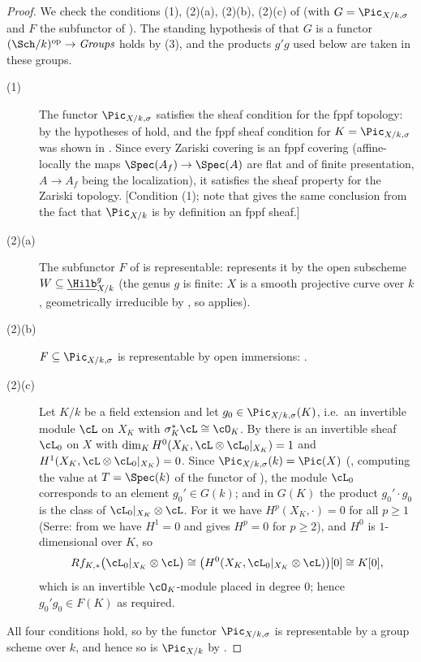 \begin{proof}
We check the conditions (1), (2)(a), (2)(b), (2)(c) of
 (with $G=\Pic_{X/k,\sigma}$ and $F$ the
subfunctor of ).  The standing hypothesis
of  that $G$ is a functor
$(\Sch/k)^{\mathrm{op}}\to\textit{Groups}$ holds by
(3), and the products $g'g$ used below are
taken in these groups.
\begin{description}
\item[(1)] The functor $\Pic_{X/k,\sigma}$ satisfies the sheaf condition
for the fppf topology: by  the hypotheses of
 hold, and the fppf sheaf condition for
$K=\Pic_{X/k,\sigma}$ was shown in
.  Since every Zariski covering is an fppf covering
(affine-locally the maps $\Spec(A_f)\to\Spec(A)$ are flat and of finite
presentation, $A\to A_f$ being the localization), it satisfies the sheaf
property for the Zariski topology.  [Condition (1); note that
 gives the same conclusion from the fact that
$\Pic_{X/k}$ is by definition an fppf sheaf.]
\item[(2)(a)] The subfunctor $F$ of  is
representable:  represents it by the open
subscheme $W\subseteq\underline{\Hilb}^g_{X/k}$ (the genus $g$ is finite:
$X$ is a smooth projective curve over $k$, geometrically irreducible by
, so  applies).
\item[(2)(b)] $F\subseteq\Pic_{X/k,\sigma}$ is representable by open
immersions: .
\item[(2)(c)] Let $K/k$ be a field extension and let
$g_0\in\Pic_{X/k,\sigma}(K)$, i.e.\ an invertible module $\cL$ on $X_K$
with $\sigma_K^*\cL\cong\cO_K$.  By  there is an
invertible sheaf $\cL_0$ on $X$ with
$\dim_KH^0(X_K,\cL\otimes\cL_0|_{X_K})=1$ and
$H^1(X_K,\cL\otimes\cL_0|_{X_K})=0$.  Since
$\Pic_{X/k,\sigma}(k)=\Pic(X)$ (, computing
the value at $T=\Spec(k)$ of the functor of
), the
module $\cL_0$ corresponds to an element $g_0'\in G(k)$; and in
$G(K)$ the product $g_0'\cdot g_0$ is the class of
$\cL_0|_{X_K}\otimes\cL$.  For it we have
$H^p(X_K,\cdot)=0$ for all $p\geq1$
(Serre: from  we have $H^1=0$ and
 gives $H^p=0$ for $p\geq2$), and
$H^0$ is $1$-dimensional over $K$, so
\[
Rf_{K,*}\bigl(\cL_0|_{X_K}\otimes\cL\bigr)\cong\bigl(H^0(X_K,\cL_0|_{X_K}\otimes\cL)\bigr)[0]
\cong K[0],
\]
which is an invertible $\cO_K$-module placed in degree $0$; hence
$g_0'g_0\in F(K)$ as required.
\end{description}
All four conditions hold, so by  the functor
$\Pic_{X/k,\sigma}$ is representable by a group scheme over $k$, and
hence so is $\Pic_{X/k}$ by .
\end{proof}

